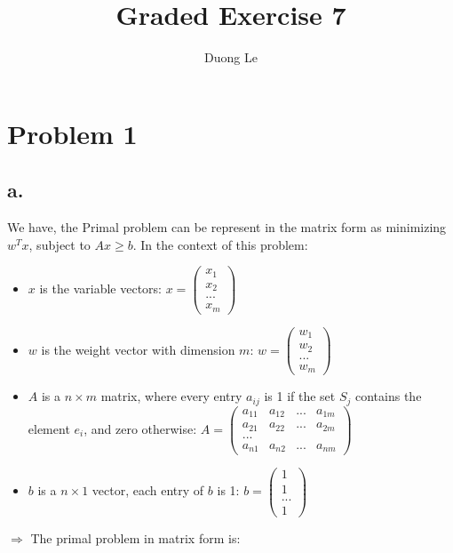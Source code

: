\documentclass{article}
\title{Graded Exercise 7}
\author{Duong Le}
\date{}
\begin{document}
\maketitle

\section*{Problem 1}
\subsection*{a.}
We have, the Primal problem can be represent in the matrix form as minimizing $w^{T}x$, subject to $Ax \geq b$. In the context of this problem:
\begin{itemize}
\item $x$ is the variable vectors: $x = \left( \begin{smallmatrix} x_1 \\ x_2 \\ ... \\ x_m \end{smallmatrix} \right)$
\item $w$ is the weight vector with dimension $m$: $w = \left( \begin{smallmatrix} w_1 \\ w_2 \\ ... \\ w_m \end{smallmatrix} \right)$ 
\item $A$ is a $n \times m$ matrix, where every entry $a_{ij}$ is 1 if the set $S_j$ contains the element $e_i$, and zero otherwise: $A = \left( \begin{smallmatrix} a_{11} & a_{12} & ... & a_{1m} \\ a_{21} & a_{22} & ... & a_{2m} \\ ... \\ a_{n1} & a_{n2} & ... & a_{nm} \end{smallmatrix} \right)$ 
\item $b$ is a $n \times 1$ vector, each entry of $b$ is 1: $b = \left( \begin{smallmatrix} 1 \\ 1 \\ ... \\ 1 \end{smallmatrix} \right)$
\end{itemize}
$\Rightarrow$ The primal problem in matrix form is:
\end{document}
